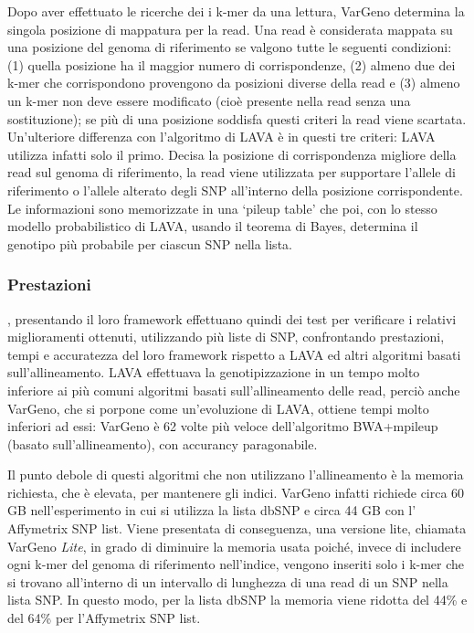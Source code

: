 \documentclass[../main.tex]{subfiles}
\begin{document}
Dopo aver effettuato le ricerche dei i k-mer da una lettura, VarGeno determina la singola posizione di mappatura per la read. Una read è considerata mappata su una posizione del genoma di riferimento se valgono tutte le seguenti condizioni: (1) quella posizione ha il maggior numero di corrispondenze, (2) almeno due dei k-mer che corrispondono provengono da posizioni diverse della read e (3) almeno un k-mer non deve essere modificato (cioè presente nella read senza una sostituzione); se più di una posizione soddisfa questi criteri la read viene scartata. Un’ulteriore differenza con l’algoritmo di LAVA è in questi tre criteri: LAVA utilizza infatti solo il primo. Decisa la posizione di corrispondenza migliore della read sul genoma di riferimento, la read viene utilizzata per supportare l'allele di riferimento o l’allele alterato degli SNP all'interno della posizione corrispondente. Le informazioni sono memorizzate in una ‘pileup table’ che poi, con lo stesso modello probabilistico di LAVA, usando il teorema di Bayes, determina il genotipo più probabile per ciascun SNP nella lista.

\subsubsection{Prestazioni}
\cite{sun-medvedev2018vargeno}, presentando il loro framework effettuano quindi dei test per verificare i relativi miglioramenti ottenuti, utilizzando più liste di SNP, confrontando prestazioni, tempi e accuratezza del loro framework rispetto a LAVA ed altri algoritmi basati sull’allineamento. LAVA effettuava la genotipizzazione in un tempo molto inferiore ai più comuni algoritmi basati sull’allineamento delle read, perciò anche VarGeno, che si porpone come un'evoluzione di LAVA, ottiene tempi molto inferiori ad essi: VarGeno è 62 volte più veloce dell’algoritmo BWA+mpileup (basato sull'allineamento), con accurancy paragonabile. 

Il punto debole di questi algoritmi che non utilizzano l’allineamento è la memoria richiesta, che è elevata, per mantenere gli indici. VarGeno infatti richiede circa 60 GB nell’esperimento in cui si utilizza la lista dbSNP e circa 44 GB con l’ Affymetrix SNP list. Viene presentata di conseguenza, una versione lite, chiamata VarGeno \textit{Lite}, in grado di diminuire la memoria usata poiché, invece di includere ogni k-mer del genoma di riferimento nell'indice, vengono inseriti solo i k-mer che si trovano all'interno di un intervallo di lunghezza di una read di un SNP nella lista SNP. In questo modo, per la lista dbSNP la memoria viene ridotta del 44\% e del 64\% per l’Affymetrix SNP list.\\
\end{document}
